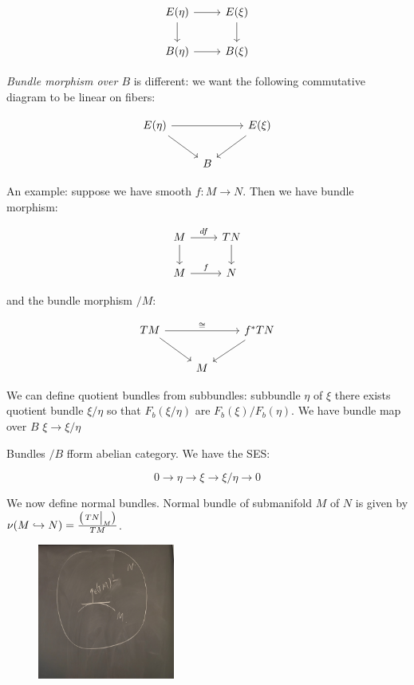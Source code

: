 \documentclass{article}
\theoremstyle{definition}
\begin{document}
\begin{enumerate}[label=\alph*)]
        \[
            \begin{tikzcd}
                E(\eta) \ar[r] \ar[d] & E(\xi) \ar[d] \\ B(\eta) \ar[r] & B(\xi)
            \end{tikzcd}
        \]

        \textit{Bundle morphism over \(B\)} is different: we want the following commutative diagram to be linear on fibers:

        \[
            \begin{tikzcd}
                E(\eta) \ar[rr] \ar[rd] & & E(\xi)  \ar[ld] \\ & B
            \end{tikzcd}
        \]

        An example: suppose we have smooth \(f: M \to N\). Then we have bundle morphism:

        \[
            \begin{tikzcd}
                M \ar[d] \ar[r,"df"] & TN \ar[d] \\ M \ar[r,"f"] & N
            \end{tikzcd}
        \]

        and the bundle morphism \(/ M\):

        \[
            \begin{tikzcd}
                TM \ar[rr,"\cong"] \ar[rd] & & f^{\ast} TN \ar[ld] \\ & M
            \end{tikzcd}
        \]

        We can define quotient bundles from subbundles: subbundle \(\eta\) of \(\xi\) there exists quotient bundle \(\xi / \eta\) so that \(F_b(\xi / \eta)\) are \(F_b(\xi) / F_b(\eta)\). We have bundle map over \(B\) \(\xi \to \xi / \eta\) 

        Bundles \(/ B\) fform abelian category. We have the SES:

        \[
            0 \to \eta \to \xi \to \xi / \eta \to 0
        \]

        We now define normal bundles. Normal bundle of submanifold \(M\) of \(N\) is given by \(\nu (M \hookrightarrow N) = \frac{\left( \eval{TN}_{M}^{} \right) }{TM}\).
        
        \begin{figure}[H]
            \centering
            \includegraphics[width=0.4\textwidth]{img/normal}
            \caption{}
        \end{figure}


\end{enumerate}
\end{document}
